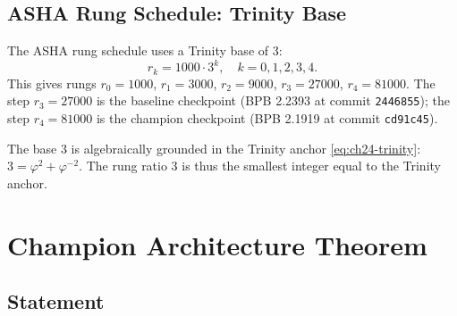 \subsection{ASHA Rung Schedule: Trinity Base}
\label{subsec:ch24-asha-rung-schedule}

The ASHA rung schedule uses a Trinity base of 3:
\begin{equation}\label{eq:ch24-rungs}
  r_k = 1000 \cdot 3^k, \quad k = 0, 1, 2, 3, 4.
\end{equation}
This gives rungs $r_0 = 1000$, $r_1 = 3000$, $r_2 = 9000$, $r_3 = 27000$,
$r_4 = 81000$.  The step $r_3 = 27000$ is the baseline checkpoint (BPB 2.2393
at commit \texttt{2446855}); the step $r_4 = 81000$ is the champion checkpoint
(BPB 2.1919 at commit \texttt{cd91c45}).

The base 3 is algebraically grounded in the Trinity anchor
\eqref{eq:ch24-trinity}: $3 = \varphi^2 + \varphi^{-2}$.  The rung ratio 3
is thus the smallest integer equal to the Trinity anchor.

\section{Champion Architecture Theorem}
\label{sec:ch24-theorem}

\subsection{Statement}
\label{subsec:ch24-theorem-statement}

